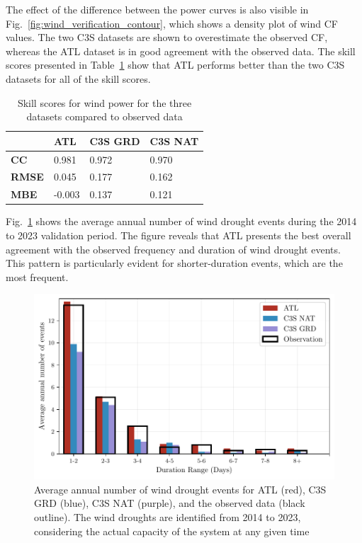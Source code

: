 \documentclass[preprint, 12pt]{elsarticle}
\begin{document}
The effect of the difference between the power curves is also visible in Fig.~\ref{fig:wind_verification_contour}, which shows a density plot of wind CF values. The two C3S datasets are shown to overestimate the observed CF, whereas the ATL dataset is in good agreement with the observed data. The skill scores presented in Table~\ref{tab:wind_skill_scores} show that ATL performs better than the two C3S datasets for all of the skill scores. 

\begin{table}[!ht]
	\centering
	\begin{tabular}{l|lll|}
		\cline{2-4}
		& \textbf{ATL} & \textbf{C3S GRD} & \textbf{C3S NAT} \\ \hline
		\multicolumn{1}{|l|}{\textbf{CC}}   & 0.981           & 0.972            & 0.970            \\ \hline
		\multicolumn{1}{|l|}{\textbf{RMSE}} & 0.045           & 0.177            & 0.162            \\ \hline
		\multicolumn{1}{|l|}{\textbf{MBE}}   & -0.003          & 0.137            & 0.121            \\ \hline
	\end{tabular}
	\caption{Skill scores for wind power for the three datasets compared to observed data}
	\label{tab:wind_skill_scores}
\end{table}

Fig.~\ref{fig:bar_number_events_verification_wind} shows the average annual number of wind drought events during the 2014 to 2023 validation period. The figure reveals that ATL presents the best overall agreement with the observed frequency and duration of wind drought events. This pattern is particularly evident for shorter-duration events, which are the most frequent.

\begin{figure}[!ht]
	\centering
	\includegraphics[width=\textwidth]{verification_wind_number_events.pdf}
	\caption{Average annual number of wind drought events for ATL (red), C3S GRD (blue), C3S NAT (purple), and the observed data (black outline). The wind droughts are identified from 2014 to 2023, considering the actual capacity of the system at any given time}
	\label{fig:bar_number_events_verification_wind}
\end{figure}
\end{document}
